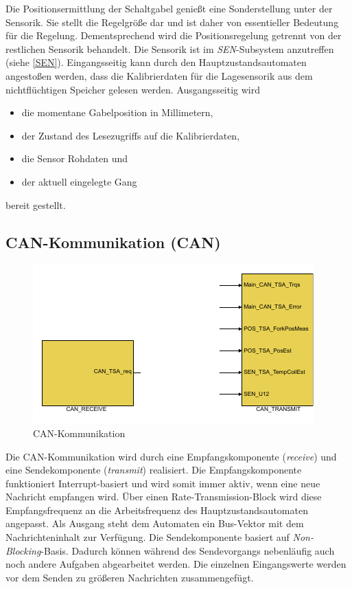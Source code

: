 Die Positionsermittlung der Schaltgabel genießt eine Sonderstellung unter der Sensorik. Sie stellt die Regelgröße dar und ist daher von essentieller Bedeutung für die Regelung.  Dementsprechend wird die Positionsregelung getrennt von der restlichen Sensorik behandelt. Die Sensorik ist im \textit{SEN}-Subsystem anzutreffen (siehe \autoref{SEN}). Eingangsseitig kann durch den Hauptzustandsautomaten angestoßen werden, dass die Kalibrierdaten für die Lagesensorik aus dem nichtflüchtigen Speicher gelesen werden. Ausgangsseitig wird 
\begin{itemize}
	\item die momentane Gabelposition in Millimetern,
	\item der Zustand des Lesezugriffs auf die Kalibrierdaten,
	\item die Sensor Rohdaten und 
	\item der aktuell eingelegte Gang
\end{itemize}
bereit gestellt.

\subsection{CAN-Kommunikation (CAN)}

\begin{figure}[H]%
\centering
\includegraphics[width=0.6\columnwidth]{./Bilder/fig_can}%
\caption{CAN-Kommunikation}%
\label{fig_can}%
\end{figure}

Die CAN-Kommunikation wird durch eine Empfangskomponente (\textit{receive}) und eine Sendekomponente (\textit{transmit}) realisiert. Die Empfangskomponente funktioniert Interrupt-basiert und wird somit immer aktiv, wenn eine neue Nachricht empfangen wird. Über einen Rate-Transmission-Block wird diese Empfangsfrequenz an die Arbeitsfrequenz des Hauptzustandsautomaten angepasst. Als Ausgang steht dem Automaten ein Bus-Vektor mit dem Nachrichteninhalt zur Verfügung. 
Die Sendekomponente basiert auf \textit{Non-Blocking}-Basis. Dadurch können während des Sendevorgangs nebenläufig auch noch andere Aufgaben abgearbeitet werden. Die einzelnen Eingangswerte werden vor dem Senden zu größeren Nachrichten zusammengefügt.

